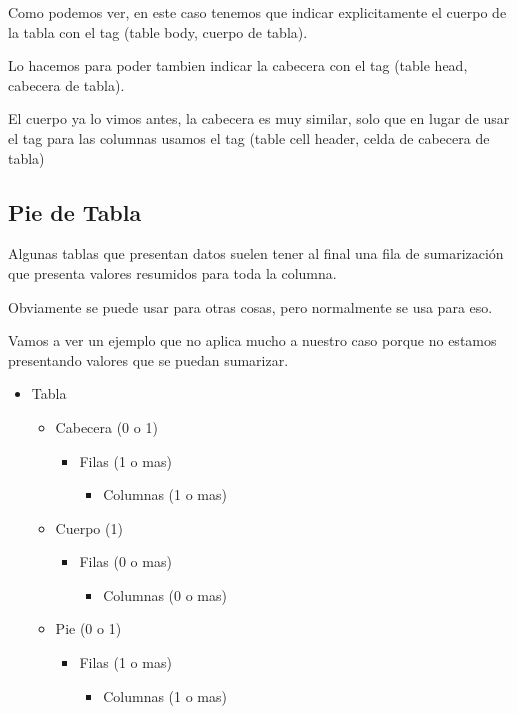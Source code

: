 \documentclass[letterpaper,10pt,spanish]{sphinxmanual}
\begin{document}
Como podemos ver, en este caso tenemos que indicar explicitamente el cuerpo
de la tabla con el tag  (table body, cuerpo de tabla).

Lo hacemos para poder tambien indicar la cabecera con el tag  (table
head, cabecera de tabla).

El cuerpo ya lo vimos antes, la cabecera es muy similar, solo que en lugar de
usar el tag  para las columnas usamos el tag  (table cell header, celda
de cabecera de tabla)


\subsection{Pie de Tabla}
\label{\detokenize{hay-tabla:pie-de-tabla}}
Algunas tablas que presentan datos suelen tener al final una fila de
sumarización que presenta valores resumidos para toda la columna.

Obviamente se puede usar para otras cosas, pero normalmente se usa para eso.

Vamos a ver un ejemplo que no aplica mucho a nuestro caso porque no estamos
presentando valores que se puedan sumarizar.
\begin{itemize}
\item {} 
Tabla
\begin{itemize}
\item {} 
Cabecera (0 o 1)
\begin{itemize}
\item {} 
Filas (1 o mas)
\begin{itemize}
\item {} 
Columnas (1 o mas)

\end{itemize}

\end{itemize}

\item {} 
Cuerpo (1)
\begin{itemize}
\item {} 
Filas (0 o mas)
\begin{itemize}
\item {} 
Columnas (0 o mas)

\end{itemize}

\end{itemize}

\item {} 
Pie (0 o 1)
\begin{itemize}
\item {} 
Filas (1 o mas)
\begin{itemize}
\item {} 
Columnas (1 o mas)

\end{itemize}

\end{itemize}

\end{itemize}

\end{itemize}
\end{document}
